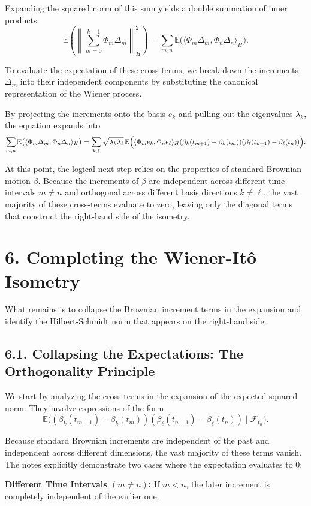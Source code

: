 \documentclass[11pt]{article}
\theoremstyle{definition}
\theoremstyle{remark}
\begin{document}
Expanding the squared norm of this sum yields a double summation of inner products:
\[
\mathbb E\left(\left\|\sum_{m=0}^{k-1}\Phi_m\Delta_m\right\|_H^2\right)
=
\sum_{m,n}\mathbb E\bigl(\langle \Phi_m\Delta_m,\Phi_n\Delta_n\rangle_H\bigr).
\]

To evaluate the expectation of these cross-terms, we break down the increments \(\Delta_m\) into their independent components by substituting the canonical representation of the Wiener process.

By projecting the increments onto the basis \(e_k\) and pulling out the eigenvalues \(\lambda_k\), the equation expands into
\[
\sum_{m,n}\mathbb E\bigl(\langle \Phi_m\Delta_m,\Phi_n\Delta_n\rangle_H\bigr)
=
\sum_{k,\ell}\sqrt{\lambda_k\lambda_\ell}\,
\mathbb E\Bigl(\langle \Phi_m e_k,\Phi_n e_\ell\rangle_H
(\beta_k(t_{m+1})-\beta_k(t_m))(\beta_\ell(t_{n+1})-\beta_\ell(t_n))\Bigr).
\]

At this point, the logical next step relies on the properties of standard Brownian motion \(\beta\). Because the increments of \(\beta\) are independent across different time intervals \(m\neq n\) and orthogonal across different basis directions \(k\neq \ell\), the vast majority of these cross-terms evaluate to zero, leaving only the diagonal terms that construct the right-hand side of the isometry.

\section*{6. Completing the Wiener-It\^o Isometry}
What remains is to collapse the Brownian increment terms in the expansion and identify the Hilbert-Schmidt norm that appears on the right-hand side.

\subsection*{6.1. Collapsing the Expectations: The Orthogonality Principle}
We start by analyzing the cross-terms in the expansion of the expected squared norm. They involve expressions of the form
\[
\mathbb E\bigl((\beta_k(t_{m+1})-\beta_k(t_m))(\beta_\ell(t_{n+1})-\beta_\ell(t_n))\mid \mathcal F_{t_n}\bigr).
\]

Because standard Brownian increments are independent of the past and independent across different dimensions, the vast majority of these terms vanish. The notes explicitly demonstrate two cases where the expectation evaluates to \(0\):

\textbf{Different Time Intervals \((m\neq n)\):} If \(m<n\), the later increment is completely independent of the earlier one.
\end{document}
